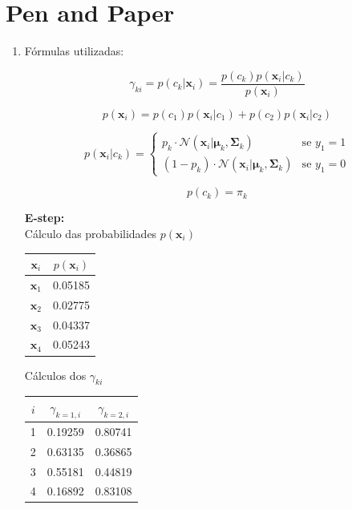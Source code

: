 \documentclass[a4paper,12pt]{article} %
\begin{document}
\section*{Pen and Paper}
\begin{enumerate}

\item Fórmulas utilizadas:

\begin{equation}
    \gamma_{ki} = p(c_k|\mathbf{x}_i) = \frac{p(c_k)p(\mathbf{x}_i|c_k)}{p(\mathbf{x}_i)}
\end{equation}

\begin{equation}
    p(\mathbf{x}_i) = p(c_1)p(\mathbf{x}_i|c_1)+p(c_2)p(\mathbf{x}_i|c_2)
\end{equation}

\begin{equation}
    p(\mathbf{x}_i|c_k) =
    \begin{cases} 
        p_{k} \cdot \mathcal{N}(\mathbf{x}_i|\boldsymbol{\mu}_k,\boldsymbol{\Sigma}_k) & \text{se } y_1 = 1 \\
        (1-p_k) \cdot \mathcal{N}(\mathbf{x}_i|\boldsymbol{\mu}_k,\boldsymbol{\Sigma}_k) & \text{se } y_1 = 0 
    \end{cases}
    \label{eq:p_xi_ck}
\end{equation}

\begin{equation}
    p(c_k) = \pi_k
\end{equation}

\textbf{E-step:} \\

Cálculo das probabilidades $p(\textbf{x}_i)$
\begin{center}
\begin{tabular}{c|c}

$\mathbf{x}_i$ & $p(\mathbf{x}_i)$ \\
\hline
$\mathbf{x}_1$ & 0.05185 \\
$\mathbf{x}_2$ & 0.02775 \\
$\mathbf{x}_3$ & 0.04337 \\
$\mathbf{x}_4$ & 0.05243 \\

\end{tabular}
\end{center}



Cálculos dos $\gamma_{ki}$

\begin{center}
\begin{tabular}{c|c|c}
$i$ & $\gamma_{k=1,i}$ & $\gamma_{k=2,i}$ \\
\hline
1 & 0.19259 & 0.80741 \\
2 & 0.63135 & 0.36865 \\
3 & 0.55181 & 0.44819 \\
4 & 0.16892 & 0.83108 \\
\end{tabular}
\end{center}


\end{enumerate}
\end{document}
